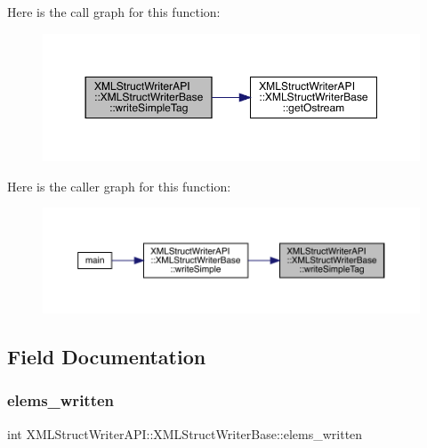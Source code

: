Here is the call graph for this function\+:
\nopagebreak
\begin{figure}[H]
\begin{center}
\leavevmode
\includegraphics[width=350pt]{db/d4f/classXMLStructWriterAPI_1_1XMLStructWriterBase_a049c80e79c8f64d2b6b0221c01392d37_cgraph}
\end{center}
\end{figure}
Here is the caller graph for this function\+:\nopagebreak
\begin{figure}[H]
\begin{center}
\leavevmode
\includegraphics[width=350pt]{db/d4f/classXMLStructWriterAPI_1_1XMLStructWriterBase_a049c80e79c8f64d2b6b0221c01392d37_icgraph}
\end{center}
\end{figure}


\subsection{Field Documentation}
\mbox{\label{classXMLStructWriterAPI_1_1XMLStructWriterBase_a255acd33078c52b9bd9b1f0414cd03e3}} 
\subsubsection{\texorpdfstring{elems\_written}{elems\_written}}
{\footnotesize\ttfamily int X\+M\+L\+Struct\+Writer\+A\+P\+I\+::\+X\+M\+L\+Struct\+Writer\+Base\+::elems\+\_\+written\hspace{0.3cm}{\ttfamily [protected]}}

